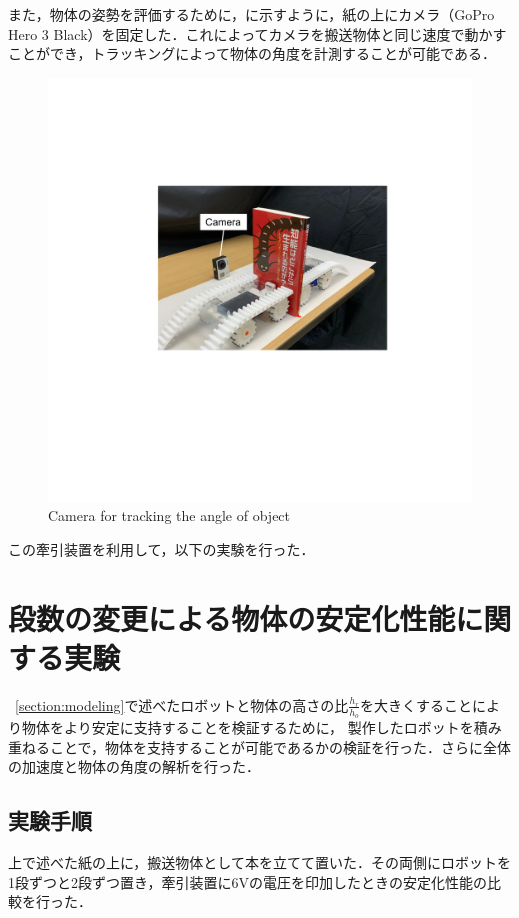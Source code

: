 また，物体の姿勢を評価するために，に示すように，紙の上にカメラ（GoPro Hero 3 Black）を固定した．これによってカメラを搬送物体と同じ速度で動かすことができ，トラッキングによって物体の角度を計測することが可能である．

\begin{figure}[tb]
  \centering
  \includegraphics[width=0.7\columnwidth]{figure/gopro.pdf}
  \caption{Camera for tracking the angle of object}
  \label{fig:gopro}
\end{figure}
この牽引装置を利用して，以下の実験を行った．

\section{段数の変更による物体の安定化性能に関する実験}
\label{section:exp2}
~\ref{section:modeling}で述べたロボットと物体の高さの比$\frac{h_{r}}{h_{o}}$を大きくすることにより物体をより安定に支持することを検証するために，
製作したロボットを積み重ねることで，物体を支持することが可能であるかの検証を行った．さらに全体の加速度と物体の角度の解析を行った．

\subsection{実験手順}
上で述べた紙の上に，搬送物体として本を立てて置いた．その両側にロボットを1段ずつと2段ずつ置き，牽引装置に6Vの電圧を印加したときの安定化性能の比較を行った．

